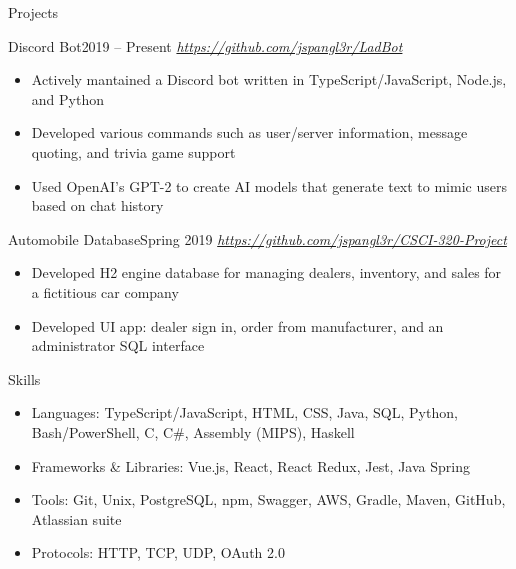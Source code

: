 \documentclass[]{mcdowellcv}
\begin{document}
	\begin{cvsection}{Projects}
		\begin{cvsubsection}{Discord Bot}{}{2019 -- Present}
			\textit{\url{https://github.com/jspangl3r/LadBot}}
			\begin{itemize}
				\item Actively mantained a Discord bot written in TypeScript/JavaScript, Node.js, and Python
				\item Developed various commands such as user/server information, message quoting, and trivia game support
				\item Used OpenAI's GPT-2 to create AI models that generate text to mimic users based on chat history
			\end{itemize}
		\end{cvsubsection}

		\begin{cvsubsection}{Automobile Database}{}{Spring 2019}
			\textit{\url{https://github.com/jspangl3r/CSCI-320-Project}}
			\begin{itemize}
				\item Developed H2 engine database for managing dealers, inventory, and sales for a fictitious car company
				\item Developed UI app: dealer sign in, order from manufacturer, and an administrator SQL interface
			\end{itemize}
		\end{cvsubsection}
	\end{cvsection}

	\begin{cvsection}{Skills}
		\begin{cvsubsection}{}{}{}	
			\begin{itemize}
				\item Languages: TypeScript/JavaScript, HTML, CSS, Java, SQL, Python, Bash/PowerShell, C, C\#, Assembly (MIPS), Haskell 
				\item Frameworks \& Libraries: Vue.js, React, React Redux, Jest, Java Spring
				\item Tools: Git, Unix, PostgreSQL, npm, Swagger, AWS, Gradle, Maven, GitHub, Atlassian suite
				\item Protocols: HTTP, TCP, UDP, OAuth 2.0
			\end{itemize}
		\end{cvsubsection}
	\end{cvsection}
	
\end{document}
